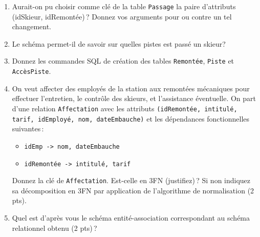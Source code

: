 \begin{enumerate}
 \item Aurait-on pu choisir comme clé de la table \texttt{Passage}
      la paire d'attributs (idSkieur, idRemontée)\,? Donnez vos arguments pour ou contre
      un tel changement.
       
  \item Le schéma permet-il de savoir sur quelles pistes est passé un skieur?
  
 \item Donnez les commandes SQL de création des tables \texttt{Remontée}, \texttt{Piste}
 et \texttt{AccèsPiste}.
        
   \item On veut affecter des employés de la station aux  
   remontées mécaniques pour effectuer l'entretien, le contrôle des skieurs,
     et l'assistance éventuelle. On part d'une relation \texttt{Affectation}
     avec les attributs
       \texttt{(idRemontée, intitulé, tarif, idEmployé, nom, dateEmbauche)} 
       et les dépendances fonctionnelles suivantes\,:
  \begin{itemize}
    \item \texttt{idEmp -> nom, dateEmbauche}
    \item \texttt{idRemontée -> intitulé, tarif}
  \end{itemize}

   Donnez la clé de \texttt{Affectation}. Est-celle en 3FN (justifiez)\,?
   Si non indiquez sa décomposition en 3FN par 
   application de l'algorithme de normalisation (2 pts).
   
 \item Quel est d'après vous le schéma entité-association 
        correspondant au schéma relationnel obtenu (2 pts)\,?
\end{enumerate}

